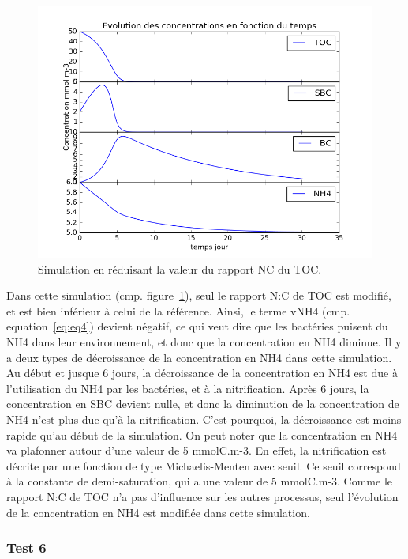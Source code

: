 \begin{figure}[h!]
  \includegraphics[width=\textwidth]{partie1/Test5.png}
  \caption{Simulation en r\'eduisant la valeur du rapport NC du TOC.}
  \label{fig:partie1test5}
\end{figure}

\par{
Dans cette simulation (cmp. figure~\ref{fig:partie1test5}), seul le rapport N:C de TOC est modifi\'e, et est bien inf\'erieur \`a celui de la
r\'ef\'erence. Ainsi, le terme vNH4 (cmp. equation~\ref{eq:eq4}) devient n\'egatif, ce qui veut dire que les bact\'eries puisent du NH4
dans leur environnement, et donc que la concentration en NH4 diminue. Il y a deux types de d\'ecroissance de
la concentration en NH4 dans cette simulation. Au d\'ebut et jusque 6 jours, la d\'ecroissance de la
concentration en NH4 est due \`a l'utilisation du NH4 par les bact\'eries, et \`a la nitrification. Apr\`es
6 jours, la concentration en SBC devient nulle, et donc la diminution de la concentration de NH4 n'est plus
due qu'\`a la nitrification. C'est pourquoi, la d\'ecroissance est moins rapide qu'au d\'ebut de la simulation.
On peut noter que la concentration en NH4 va plafonner autour d'une valeur de 5 mmolC.m-3. En effet, la
nitrification est d\'ecrite par une fonction de type Michaelis-Menten avec seuil. Ce seuil correspond \`a la
constante de demi-saturation, qui a une valeur de 5 mmolC.m-3. Comme le rapport N:C de TOC n'a pas d'influence
sur les autres processus, seul l'\'evolution de la concentration en NH4 est modifi\'ee dans cette simulation.
}

\FloatBarrier
\subsubsection{Test 6}

